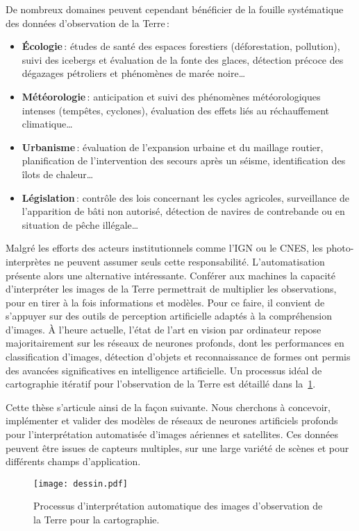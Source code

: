 De nombreux domaines peuvent cependant bénéficier de la fouille systématique des données d'observation de la Terre\,:
\begin{itemize}
	\item \textbf{Écologie}\,: études de santé des espaces forestiers (déforestation, pollution), suivi des icebergs et évaluation de la fonte des glaces, détection précoce des dégazages pétroliers et phénomènes de marée noire\dots
	\item \textbf{Météorologie}\,: anticipation et suivi des phénomènes météorologiques intenses (tempêtes, cyclones), évaluation des effets liés au réchauffement climatique\dots
	\item \textbf{Urbanisme}\,: évaluation de l'expansion urbaine et du maillage routier, planification de l'intervention des secours après un séisme, identification des îlots de chaleur\dots
	\item \textbf{Législation}\,: contrôle des lois concernant les cycles agricoles, surveillance de l'apparition de bâti non autorisé, détection de navires de contrebande ou en situation de pêche illégale\dots
\end{itemize}

Malgré les efforts des acteurs institutionnels comme l'\gls{IGN} ou le \gls{CNES}, les photo-interprètes ne peuvent assumer seuls cette responsabilité. L'automatisation présente alors une alternative intéressante. Conférer aux machines la capacité d'interpréter les images de la Terre permettrait de multiplier les observations, pour en tirer à la fois informations et modèles. Pour ce faire, il convient de s'appuyer sur des outils de perception artificielle adaptés à la compréhension d'images. À l'heure actuelle, l'état de l'art en vision par ordinateur repose majoritairement sur les réseaux de neurones profonds, dont les performances en classification d'images, détection d'objets et reconnaissance de formes ont permis des avancées significatives en intelligence artificielle. Un processus idéal de cartographie itératif pour l'observation de la Terre est détaillé dans la~\cref{fig:workflow}.

Cette thèse s'articule ainsi de la façon suivante. Nous cherchons à concevoir, implémenter et valider des modèles de réseaux de neurones artificiels profonds pour l'interprétation automatisée d'images aériennes et satellites. Ces données peuvent être issues de capteurs multiples, sur une large variété de scènes et pour différents champs d'application.

\begin{figure}[h]
    \centering
    \texttt{[image: dessin.pdf]}
		\caption{Processus d'interprétation automatique des images d'observation de la Terre pour la cartographie.}
		\label{fig:workflow}
\end{figure}

